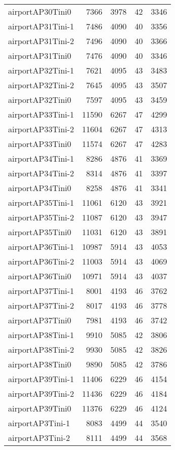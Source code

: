 \documentclass[../../../thesis.tex]{subfiles}
\begin{document}
\begin{longtable}{lrrrr}
airportAP30Tini0 & 7366 & 3978 & 42 & 3346 \\
airportAP31Tini-1 & 7486 & 4090 & 40 & 3356 \\
airportAP31Tini-2 & 7496 & 4090 & 40 & 3366 \\
airportAP31Tini0 & 7476 & 4090 & 40 & 3346 \\
airportAP32Tini-1 & 7621 & 4095 & 43 & 3483 \\
airportAP32Tini-2 & 7645 & 4095 & 43 & 3507 \\
airportAP32Tini0 & 7597 & 4095 & 43 & 3459 \\
airportAP33Tini-1 & 11590 & 6267 & 47 & 4299 \\
airportAP33Tini-2 & 11604 & 6267 & 47 & 4313 \\
airportAP33Tini0 & 11574 & 6267 & 47 & 4283 \\
airportAP34Tini-1 & 8286 & 4876 & 41 & 3369 \\
airportAP34Tini-2 & 8314 & 4876 & 41 & 3397 \\
airportAP34Tini0 & 8258 & 4876 & 41 & 3341 \\
airportAP35Tini-1 & 11061 & 6120 & 43 & 3921 \\
airportAP35Tini-2 & 11087 & 6120 & 43 & 3947 \\
airportAP35Tini0 & 11031 & 6120 & 43 & 3891 \\
airportAP36Tini-1 & 10987 & 5914 & 43 & 4053 \\
airportAP36Tini-2 & 11003 & 5914 & 43 & 4069 \\
airportAP36Tini0 & 10971 & 5914 & 43 & 4037 \\
airportAP37Tini-1 & 8001 & 4193 & 46 & 3762 \\
airportAP37Tini-2 & 8017 & 4193 & 46 & 3778 \\
airportAP37Tini0 & 7981 & 4193 & 46 & 3742 \\
airportAP38Tini-1 & 9910 & 5085 & 42 & 3806 \\
airportAP38Tini-2 & 9930 & 5085 & 42 & 3826 \\
airportAP38Tini0 & 9890 & 5085 & 42 & 3786 \\
airportAP39Tini-1 & 11406 & 6229 & 46 & 4154 \\
airportAP39Tini-2 & 11436 & 6229 & 46 & 4184 \\
airportAP39Tini0 & 11376 & 6229 & 46 & 4124 \\
airportAP3Tini-1 & 8083 & 4499 & 44 & 3540 \\
airportAP3Tini-2 & 8111 & 4499 & 44 & 3568 \\

\end{longtable}
\end{document}
